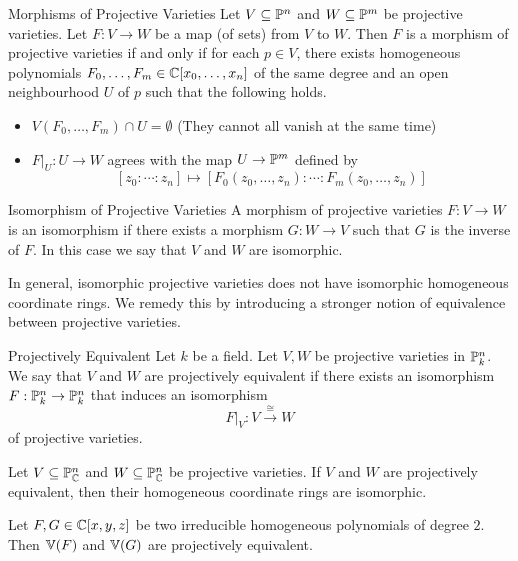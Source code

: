 \documentclass[a4paper]{article}
\begin{document}
\begin{prp}{Morphisms of Projective Varieties}{} Let $V\subseteq\mathbb{P}^n$ and $W\subseteq\mathbb{P}^m$ be projective varieties. Let $F:V\to W$ be a map (of sets) from $V$ to $W$. Then $F$ is a morphism of projective varieties if and only if for each $p\in V$, there exists homogeneous polynomials $F_0,\dots,F_m\in\mathbb{C}[x_0,\dots,x_n]$ of the same degree and an open neighbourhood $U$ of $p$ such that the following holds. 
\begin{itemize}
\item $V(F_0,\dots,F_m)\cap U=\emptyset$ (They cannot all vanish at the same time)
\item $F|_U:U\to W$ agrees with the map $U\to\mathbb{P}^m$ defined by $$[z_0:\cdots:z_n]\mapsto[F_0(z_0,\dots,z_n):\cdots:F_m(z_0,\dots,z_n)]$$
\end{itemize}
\end{prp}

\begin{defn}{Isomorphism of Projective Varieties}{} A morphism of projective varieties $F:V\to W$ is an isomorphism if there exists a morphism $G:W\to V$ such that $G$ is the inverse of $F$. In this case we say that $V$ and $W$ are isomorphic. 
\end{defn}

In general, isomorphic projective varieties does not have isomorphic homogeneous coordinate rings. We remedy this by introducing a stronger notion of equivalence between projective varieties. 

\begin{defn}{Projectively Equivalent}{} Let $k$ be a field. Let $V,W$ be projective varieties in $\mathbb{P}_k^n$. We say that $V$ and $W$ are projectively equivalent if there exists an isomorphism $F:\mathbb{P}_k^n\to\mathbb{P}_k^n$ that induces an isomorphism $$F|_V:V\overset{\cong}{\longrightarrow}W$$ of projective varieties. 
\end{defn}

\begin{lmm}{}{} Let $V\subseteq\mathbb{P}_{\mathbb{C}}^n$ and $W\subseteq\mathbb{P}_{\mathbb{C}}^n$ be projective varieties. If $V$ and $W$ are projectively equivalent, then their homogeneous coordinate rings are isomorphic. 
\end{lmm}

\begin{lmm}{}{} Let $F,G\in\mathbb{C}[x,y,z]$ be two irreducible homogeneous polynomials of degree $2$. Then $\mathbb{V}(F)$ and $\mathbb{V}(G)$ are projectively equivalent. 
\end{lmm}
\end{document}
